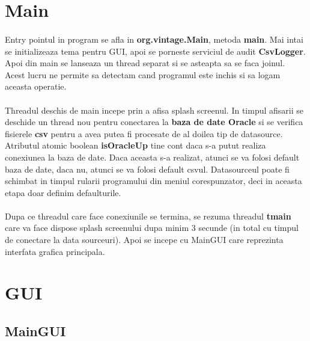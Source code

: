 \documentclass[oneside]{article}
\begin{document}
\section[Main]{Main}
\paragraph{}Entry pointul in program se afla in \textbf{org.vintage.Main}, metoda \textbf{main}. Mai intai se initializeaza tema pentru GUI, apoi se porneste serviciul de audit \textbf{CsvLogger}. Apoi din main se lanseaza un thread separat si se asteapta sa se faca joinul. Acest lucru ne permite sa detectam cand programul este inchis si sa logam aceasta operatie. 
\paragraph{} Threadul deschis de main incepe prin a afisa splash screenul. In timpul afisarii se deschide un thread nou pentru conectarea la \textbf{baza de date Oracle} si se verifica fisierele \textbf{csv} pentru a avea putea fi procesate de al doilea tip de datasource. Atributul atomic boolean \textbf{isOracleUp} tine cont daca s-a putut realiza conexiunea la baza de date. Daca aceasta s-a realizat, atunci se va folosi default baza de date, daca nu, atunci se va folosi default csvul. Datasourceul poate fi schimbat in timpul rularii programului din meniul corespunzator, deci in aceasta etapa doar definim defaulturile.
\paragraph{} Dupa ce threadul care face conexiunile se termina, se rezuma threadul \textbf{tmain} care va face dispose splash screenului dupa minim 3 secunde (in total cu timpul de conectare la data sourceuri). Apoi se incepe cu MainGUI care reprezinta interfata grafica principala.

\section[GUI]{GUI}
\subsection[MainGUI]{MainGUI}
\end{document}
